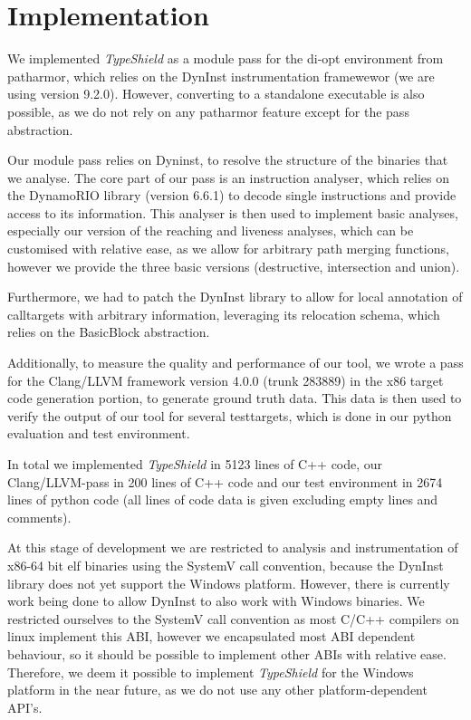 \chapter{Implementation}
\label{chapter:Implementation}

We implemented \textit{TypeShield} as a module pass for the di-opt environment from patharmor\cite{veen:cfi}, which relies on the DynInst \cite{bernat:dyninst} instrumentation framewewor (we are using version 9.2.0). However, converting to a standalone executable is also possible, as we do not rely on any patharmor feature except for the pass abstraction.

Our module pass relies on Dyninst, to resolve the structure of the binaries that we analyse. The core part of our pass is an instruction analyser, which relies on the DynamoRIO \cite{dynamorio:drmemory} library (version 6.6.1) to decode single instructions and provide access to its information. This analyser is then used to implement basic analyses, especially our version of the reaching and liveness analyses, which can be customised with relative ease, as we allow for arbitrary path merging functions, however we provide the three basic versions (destructive, intersection and union).

Furthermore, we had to patch the DynInst library to allow for local annotation of calltargets with arbitrary information, leveraging its relocation schema, which relies on the BasicBlock abstraction.

Additionally, to measure the quality and performance of our tool, we wrote a pass for the Clang/LLVM framework version 4.0.0 (trunk 283889) in the x86 target code generation portion, to generate ground truth data. This data is then used to verify the output of our tool for several testtargets, which is done in our python evaluation and test environment.

In total we implemented \textit{TypeShield} in 5123 lines of C++ code, our Clang/LLVM-pass in 200 lines of C++ code and our test environment in 2674 lines of python code (all lines of code data is given excluding empty lines and comments).

At this stage of development we are restricted to analysis and instrumentation of x86-64 bit elf binaries using the SystemV call convention, because the DynInst library does not yet support the Windows platform. However, there is currently work being done to allow DynInst to also work with Windows binaries. We restricted ourselves to the SystemV call convention as most C/C++ compilers on linux implement this ABI, however we encapsulated most ABI dependent behaviour, so it should be possible to implement other ABIs with relative ease. Therefore, we deem it possible to implement \textit{TypeShield} for the Windows platform in the near future, as we do not use any other platform-dependent API's. 

